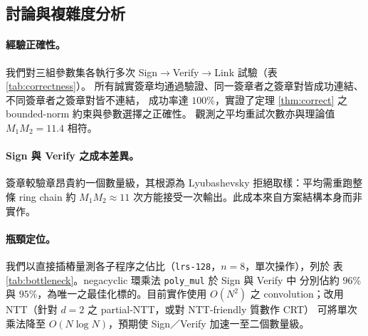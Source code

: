 \subsection{討論與複雜度分析}
\label{subsec:impl-discussion}

\paragraph{經驗正確性。}
我們對三組參數集各執行多次 Sign$\to$Verify$\to$Link 試驗（表 \ref{tab:correctness}）。
所有誠實簽章均通過驗證、同一簽章者之簽章對皆成功連結、不同簽章者之簽章對皆不連結，
成功率達 $100\%$，實證了定理 \ref{thm:correct} 之 bounded-norm 約束與參數選擇之正確性。
觀測之平均重試次數亦與理論值 $M_1M_2=11.4$ 相符。

\begin{table}[ht]
  \centering
  \caption{經驗正確性檢驗。Verify：誠實簽章是否被接受；Link：同簽章者是否連結；
           Non-link：不同簽章者是否\emph{不}連結。}
  \label{tab:correctness}
  \small
\end{table}

\paragraph{Sign 與 Verify 之成本差異。}
簽章較驗章昂貴約一個數量級，其根源為 Lyubashevsky 拒絕取樣：平均需重跑整條
ring chain 約 $M_1M_2\approx 11$ 次方能接受一次輸出。此成本來自方案結構本身而非實作。

\paragraph{瓶頸定位。}
我們以直接插樁量測各子程序之佔比（\texttt{lrs-128}，$n=8$，單次操作），列於
表 \ref{tab:bottleneck}。negacyclic 環乘法 \texttt{poly\_mul} 於 Sign 與 Verify 中
分別佔約 $96\%$ 與 $95\%$，為唯一之最佳化標的。目前實作使用 $O(N^2)$ 之
convolution；改用 NTT（針對 $d=2$ 之 partial-NTT，或對 NTT-friendly 質數作 CRT）
可將單次乘法降至 $O(N\log N)$，預期使 Sign／Verify 加速一至二個數量級。

